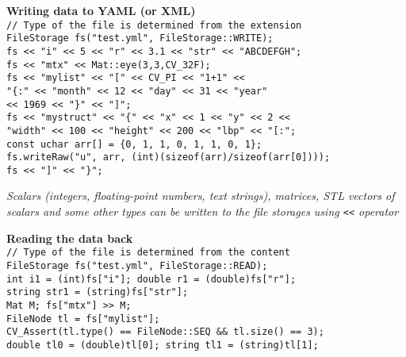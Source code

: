 \documentclass[10pt,landscape]{article}
\begin{document}
\begin{multicols}{3}
\begin{tabbing}
\textbf{Wr}\=\textbf{iting data to YAML (or XML)}\\
\texttt{// Type of the file is determined from the extension}\\
\texttt{FileStorage fs("test.yml", FileStorage::WRITE);}\\
\texttt{fs << "i" << 5 << "r" << 3.1 << "str" << "ABCDEFGH";}\\
\texttt{fs << "mtx" << Mat::eye(3,3,CV\_32F);}\\
\texttt{fs << "mylist" << "[" << CV\_PI << "1+1" <<}\\
\>\texttt{"\{:" << "month" << 12 << "day" << 31 << "year"}\\
\>\texttt{<< 1969 << "\}" << "]";}\\
\texttt{fs << "mystruct" << "\{" << "x" << 1 << "y" << 2 <<}\\
\>\texttt{"width" << 100 << "height" << 200 << "lbp" << "[:";}\\
\texttt{const uchar arr[] = \{0, 1, 1, 0, 1, 1, 0, 1\};}\\
\texttt{fs.writeRaw("u", arr, (int)(sizeof(arr)/sizeof(arr[0])));}\\
\texttt{fs << "]" << "\}";}
\end{tabbing}

\emph{Scalars (integers, floating-point numbers, text strings), matrices, STL vectors of scalars and some other types can be written to the file storages using \texttt{<<} operator}

\begin{tabbing}
\textbf{Re}\=\textbf{ading the data back}\\
\texttt{// Type of the file is determined from the content}\\
\texttt{FileStorage fs("test.yml", FileStorage::READ);}\\
\texttt{int i1 = (int)fs["i"]; double r1 = (double)fs["r"];}\\
\texttt{string str1 = (string)fs["str"];}\\

\texttt{Mat M; fs["mtx"] >> M;}\\

\texttt{FileNode tl = fs["mylist"];}\\
\texttt{CV\_Assert(tl.type() == FileNode::SEQ \&\& tl.size() == 3);}\\
\texttt{double tl0 = (double)tl[0]; string tl1 = (string)tl[1];}\\


\end{tabbing}
\end{multicols}
\end{document}
